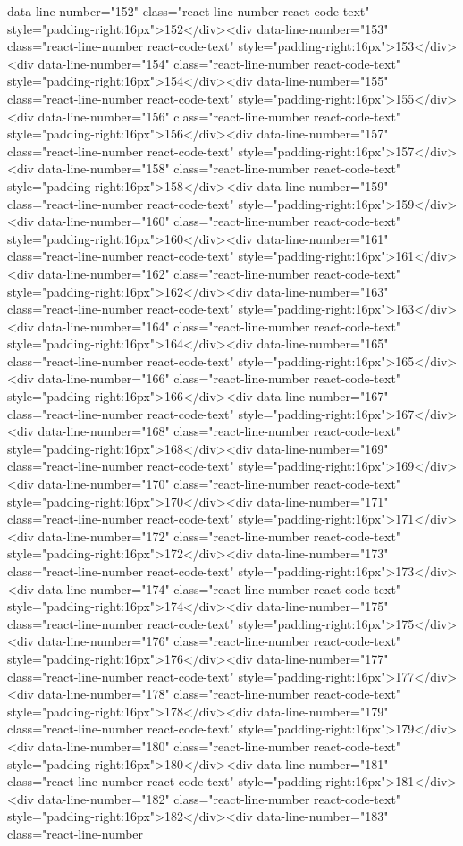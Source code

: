 data-line-number="152" class="react-line-number react-code-text" style="padding-right:16px">152</div><div data-line-number="153" class="react-line-number react-code-text" style="padding-right:16px">153</div><div data-line-number="154" class="react-line-number react-code-text" style="padding-right:16px">154</div><div data-line-number="155" class="react-line-number react-code-text" style="padding-right:16px">155</div><div data-line-number="156" class="react-line-number react-code-text" style="padding-right:16px">156</div><div data-line-number="157" class="react-line-number react-code-text" style="padding-right:16px">157</div><div data-line-number="158" class="react-line-number react-code-text" style="padding-right:16px">158</div><div data-line-number="159" class="react-line-number react-code-text" style="padding-right:16px">159</div><div data-line-number="160" class="react-line-number react-code-text" style="padding-right:16px">160</div><div data-line-number="161" class="react-line-number react-code-text" style="padding-right:16px">161</div><div data-line-number="162" class="react-line-number react-code-text" style="padding-right:16px">162</div><div data-line-number="163" class="react-line-number react-code-text" style="padding-right:16px">163</div><div data-line-number="164" class="react-line-number react-code-text" style="padding-right:16px">164</div><div data-line-number="165" class="react-line-number react-code-text" style="padding-right:16px">165</div><div data-line-number="166" class="react-line-number react-code-text" style="padding-right:16px">166</div><div data-line-number="167" class="react-line-number react-code-text" style="padding-right:16px">167</div><div data-line-number="168" class="react-line-number react-code-text" style="padding-right:16px">168</div><div data-line-number="169" class="react-line-number react-code-text" style="padding-right:16px">169</div><div data-line-number="170" class="react-line-number react-code-text" style="padding-right:16px">170</div><div data-line-number="171" class="react-line-number react-code-text" style="padding-right:16px">171</div><div data-line-number="172" class="react-line-number react-code-text" style="padding-right:16px">172</div><div data-line-number="173" class="react-line-number react-code-text" style="padding-right:16px">173</div><div data-line-number="174" class="react-line-number react-code-text" style="padding-right:16px">174</div><div data-line-number="175" class="react-line-number react-code-text" style="padding-right:16px">175</div><div data-line-number="176" class="react-line-number react-code-text" style="padding-right:16px">176</div><div data-line-number="177" class="react-line-number react-code-text" style="padding-right:16px">177</div><div data-line-number="178" class="react-line-number react-code-text" style="padding-right:16px">178</div><div data-line-number="179" class="react-line-number react-code-text" style="padding-right:16px">179</div><div data-line-number="180" class="react-line-number react-code-text" style="padding-right:16px">180</div><div data-line-number="181" class="react-line-number react-code-text" style="padding-right:16px">181</div><div data-line-number="182" class="react-line-number react-code-text" style="padding-right:16px">182</div><div data-line-number="183" class="react-line-number 